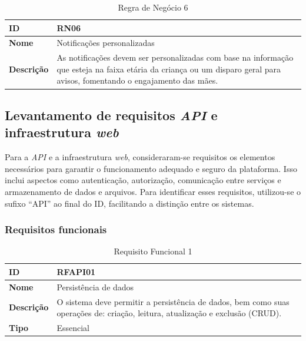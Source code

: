 \begin{table}[H]
\centering
\begin{tabular}{|l|p{12cm}|}
\hline
\textbf{ID} & RN06 \\
\hline
\textbf{Nome} & Notificações personalizadas \\
\hline
\textbf{Descrição} & As notificações devem ser personalizadas com base na informação que esteja na faixa etária da criança ou um disparo geral para avisos, fomentando o engajamento das mães. \\
\hline
\end{tabular}
\caption[RN06 -- Notificações personalizadas]{Regra de Negócio 6}
\label{tab:rn06}
\end{table}


\subsection{Levantamento de requisitos \emph{API} e infraestrutura \emph{web}}

Para a \emph{API} e a infraestrutura \emph{web}, consideraram-se requisitos os elementos necessários para garantir o funcionamento adequado e seguro da plataforma. Isso inclui aspectos como autenticação, autorização, comunicação entre serviços e armazenamento de dados e arquivos. Para identificar esses requisitos, utilizou-se o sufixo ``API'' ao final do ID, facilitando a distinção entre os sistemas.

\subsubsection{Requisitos funcionais}

\begin{table}[H]
\centering
\begin{tabular}{|l|p{12cm}|}
\hline
\textbf{ID} & RFAPI01 \\
\hline
\textbf{Nome} & Persistência de dados \\
\hline
\textbf{Descrição} & O sistema deve permitir a persistência de dados, bem como suas operações de: criação, leitura, atualização e exclusão (CRUD). \\
\hline
\textbf{Tipo} & Essencial \\
\hline
\end{tabular}
\caption[RFAPI01 -- Persistência de dados]{Requisito Funcional 1}
\label{tab:rfapi01}
\end{table}

